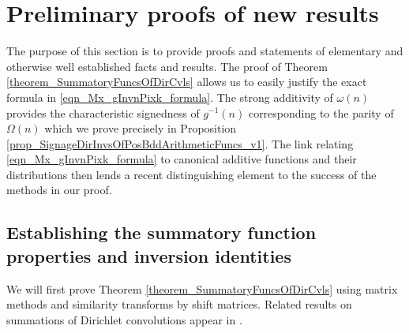\documentclass[11pt,reqno,a4letter]{article}
\numberwithin{figure}{section}
\numberwithin{table}{section}
\newcommand{\cf}{\textit{cf.\ }}
\theoremstyle{plain}
\numberwithin{theorem}{section}
\theoremstyle{definition}
\begin{document}
\newpage 
\section{Preliminary proofs of new results} 
\label{Section_PrelimProofs_Config} 

The purpose of this section is to provide proofs and statements 
of elementary and otherwise well established facts and results. The proof of 
Theorem \ref{theorem_SummatoryFuncsOfDirCvls} allows us to easily justify the exact formula in 
\eqref{eqn_Mx_gInvnPixk_formula}. 
The strong additivity of $\omega(n)$ provides the characteristic signedness of $g^{-1}(n)$ 
corresponding to the parity of $\Omega(n)$ which we prove precisely in 
Proposition \ref{prop_SignageDirInvsOfPosBddArithmeticFuncs_v1}. 
The link relating \eqref{eqn_Mx_gInvnPixk_formula} to canonical additive functions and their 
distributions then lends a recent distinguishing element to the 
success of the methods in our proof. 

\subsection{Establishing the summatory function properties and inversion identities} 

We will first prove Theorem \ref{theorem_SummatoryFuncsOfDirCvls} 
using matrix methods and similarity transforms by shift matrices. 
Related results on summations of Dirichlet convolutions appear in 
\cite[\S 2.14; \S 3.10; \S 3.12; \cf \S 4.9, p.\ 95]{APOSTOLANUMT}. 
\end{document}
